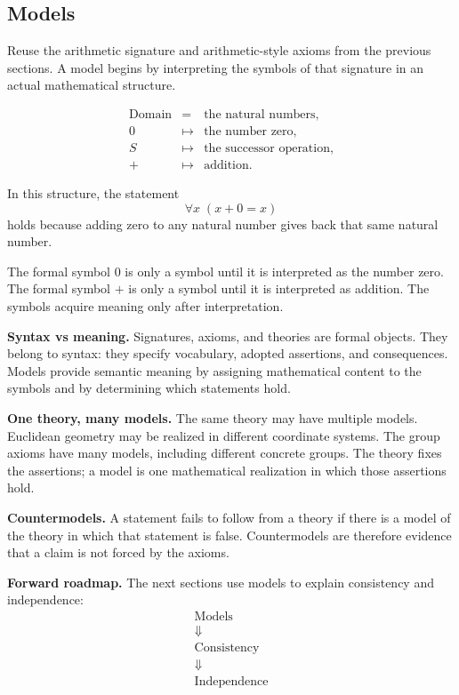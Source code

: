 \subsection*{Models}
\label{sec:axiom-systems-models}

\begin{tcolorbox}[colback=structurebox, colframe=structureborder, arc=2pt,
  left=8pt, right=8pt, top=6pt, bottom=6pt,
  title={\small\textbf{Model Presentation: Arithmetic as a Model}},
  fonttitle=\small\bfseries]
Reuse the arithmetic signature and arithmetic-style axioms from the previous
sections. A model begins by interpreting the symbols of that signature in an
actual mathematical structure.

\[
\begin{array}{rcl}
\text{Domain} & = & \text{the natural numbers},\\
0 & \mapsto & \text{the number zero},\\
S & \mapsto & \text{the successor operation},\\
+ & \mapsto & \text{addition}.
\end{array}
\]

In this structure, the statement
\[
  \forall x\;(x+0=x)
\]
holds because adding zero to any natural number gives back that same natural
number.

The formal symbol $0$ is only a symbol until it is interpreted as the number
zero. The formal symbol $+$ is only a symbol until it is interpreted as
addition. The symbols acquire meaning only after interpretation.
\end{tcolorbox}

\begin{remark*}
\textbf{Syntax vs meaning.}
Signatures, axioms, and theories are formal objects. They belong to syntax:
they specify vocabulary, adopted assertions, and consequences. Models provide
semantic meaning by assigning mathematical content to the symbols and by
determining which statements hold.

\textbf{One theory, many models.}
The same theory may have multiple models. Euclidean geometry may be realized
in different coordinate systems. The group axioms have many models, including
different concrete groups. The theory fixes the assertions; a model is one
mathematical realization in which those assertions hold.

\textbf{Countermodels.}
A statement fails to follow from a theory if there is a model of the theory in
which that statement is false. Countermodels are therefore evidence that a
claim is not forced by the axioms.

\textbf{Forward roadmap.}
The next sections use models to explain consistency and independence:
\[
\begin{array}{c}
\text{Models}\\
\Downarrow\\
\text{Consistency}\\
\Downarrow\\
\text{Independence}
\end{array}
\]
\end{remark*}

